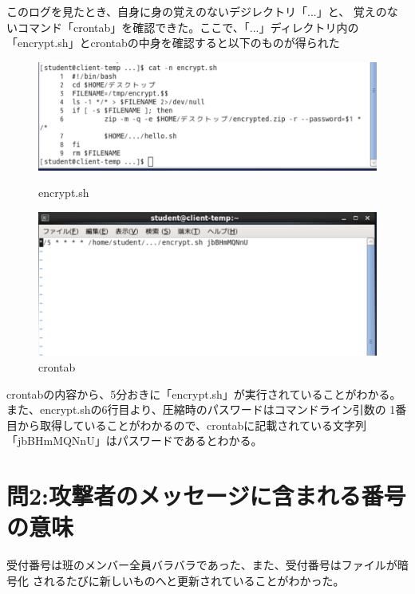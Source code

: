 \documentclass[dvipdfmx,autodetect-engine,titlepage]{jsarticle}
\begin{document}
このログを見たとき、自身に身の覚えのないデジレクトリ「...」と、
覚えのないコマンド「crontab」を確認できた。ここで、「...」ディレクトリ内の
「encrypt.sh」とcrontabの中身を確認すると以下のものが得られた
\begin{figure}[h]
  \centering
  \begin{minipage}[b]{0.45\linewidth}
  \begin{center}
    \includegraphics[keepaspectratio,scale=0.35]{pic6.png}
    \end{center}
    \caption{encrypt.sh}
  \end{minipage}
  \begin{minipage}[b]{0.45\linewidth}
  \begin{center}
    \includegraphics[keepaspectratio,scale=0.35]{pic7.png}
    \end{center}
    \caption{crontab}
  \end{minipage}
\end{figure}

 crontabの内容から、5分おきに「encrypt.sh」が実行されていることがわかる。
 また、encrypt.shの6行目より、圧縮時のパスワードはコマンドライン引数の
 1番目から取得していることがわかるので、crontabに記載されている文字列
 「jbBHmMQNnU」はパスワードであるとわかる。


\section{問2:攻撃者のメッセージに含まれる番号の意味}

受付番号は班のメンバー全員バラバラであった、また、受付番号はファイルが暗号化
されるたびに新しいものへと更新されていることがわかった。
\end{document}
